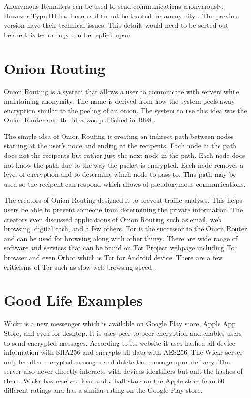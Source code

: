 \documentclass[12pt]{article}
\begin{document}
Anonymous Remailers can be used to send communications anonymously. However Type III  has been said to not be trusted for anonymity \cite{GoldbertTwo}. The previous version have their technical issues. This details would need to be sorted out before this techonlogy can be replied upon.

\section{Onion Routing}\label{}
Onion Routing is a system that allows a user to commuicate with servers while maintaining anonymity. The name is derived from how the system peels away encryption similar to the peeling of an onion. The system to use this idea was the Onion Router and the idea was published in 1998 \cite{Reed}. 

The simple idea of Onion Routing is creating an indirect path between nodes starting at the user's node and ending at the recipents. Each node in the path does not the recipents but rather just the next node in the path. Each node does not know the path due to the way the packet is encrypted. Each node removes a level of encryption and to determine which node to pass to. This path may be used so the recipent can respond which allows of pseudonymous communications.

The creators of Onion Routing designed it to prevent traffic analysis. This helps users be able to prevent someone from determining the private information. The creators even discussed applications of Onion Routing such as email, web browsing, digital cash, and a few others\cite{Reed}. Tor is the successor to the Onion Router and can be used for browsing along with other things. There are wide range of software and services that can be found on Tor Project webpage including Tor browser and even Orbot which is Tor for Android device. There are a few criticisms of Tor such as slow web browsing speed \cite{GoldbertTwo}.

\section{Good Life Examples}\label{sec:real-life}
Wickr is a new messenger which is available on Google Play store, Apple App Store, and even for desktop. It is uses peer-to-peer encryption and enables users to send encrypted messages.  According to its website it uses hashed all device information with SHA256 and encrypts all data with AES256. The Wickr server only handles encrypted messages and delete the message upon delivery. The server also never directly interacts with devices identifiers but onlt the hashes of them. Wickr has received four and a half stars on the Apple store from 80 different ratings and has a similar rating on the Google Play store. 
\end{document}
